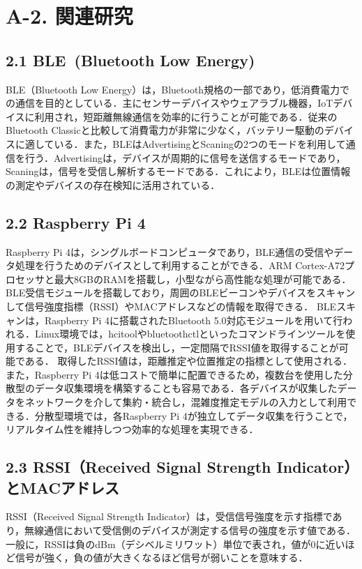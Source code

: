 \section*{A-2. 関連研究}

\subsection*{2.1 BLE\ (Bluetooth Low Energy)}
BLE（Bluetooth Low Energy）は，Bluetooth規格の一部であり，低消費電力での通信を目的としている．主にセンサーデバイスやウェアラブル機器，IoTデバイスに利用され，短距離無線通信を効率的に行うことが可能である．従来のBluetooth Classicと比較して消費電力が非常に少なく，バッテリー駆動のデバイスに適している．また，BLEはAdvertisingとScaningの2つのモードを利用して通信を行う．Advertisingは，デバイスが周期的に信号を送信するモードであり，Scaningは，信号を受信し解析するモードである．これにより，BLEは位置情報の測定やデバイスの存在検知に活用されている．

\subsection*{2.2 Raspberry Pi 4}
Raspberry Pi 4は，シングルボードコンピュータであり，BLE通信の受信やデータ処理を行うためのデバイスとして利用することができる．ARM Cortex-A72プロセッサと最大8GBのRAMを搭載し，小型ながら高性能な処理が可能である．BLE受信モジュールを搭載しており，周囲のBLEビーコンやデバイスをスキャンして信号強度指標（RSSI）やMACアドレスなどの情報を取得できる．
BLEスキャンは，Raspberry Pi 4に搭載されたBluetooth 5.0対応モジュールを用いて行われる．Linux環境では，hcitoolやbluetoothctlといったコマンドラインツールを使用することで，BLEデバイスを検出し，一定間隔でRSSI値を取得することが可能である．
取得したRSSI値は，距離推定や位置推定の指標として使用される．
また，Raspberry Pi 4は低コストで簡単に配置できるため，複数台を使用した分散型のデータ収集環境を構築することも容易である．各デバイスが収集したデータをネットワークを介して集約・統合し，混雑度推定モデルの入力として利用できる．分散型環境では，各Raspberry Pi 4が独立してデータ収集を行うことで，リアルタイム性を維持しつつ効率的な処理を実現できる．


\subsection*{2.3 RSSI（Received Signal Strength Indicator）とMACアドレス}
RSSI（Received Signal Strength Indicator）は，受信信号強度を示す指標であり，無線通信において受信側のデバイスが測定する信号の強度を示す値である．一般に，RSSIは負のdBm（デシベルミリワット）単位で表され，値が0に近いほど信号が強く，負の値が大きくなるほど信号が弱いことを意味する．

